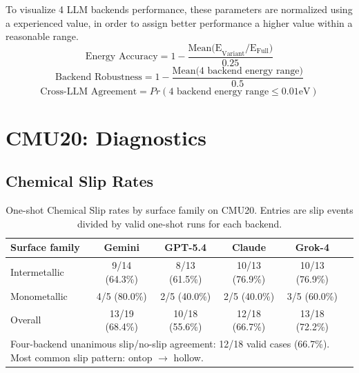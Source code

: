 \documentclass[%
 preprint,
 superscriptaddress,
 amsmath,amssymb,
 aps,
 prb,
 floatfix,
]{revtex4-2}
\begin{document}
To visualize 4 LLM backends performance, these parameters are normalized using a experienced value, in order to assign better performance a higher value within a reasonable range.
\begin{equation}
    \text{Energy Accuracy} = 1 - \frac{\text{Mean(E}_{\text{Variant}}/\text{E}_{\text{Full}})}{0.25} 
\end{equation}
\begin{equation}
    \text{Backend Robustness} = 1 - \frac{\text{Mean(4 backend energy range)}}{0.5} 
\end{equation}
\begin{equation}
\text{Cross-LLM Agreement} = Pr(\text{4 backend energy range} \leq 0.01 \text{eV}) 
\end{equation}




\section{CMU20: Diagnostics}

\subsection{Chemical Slip Rates}

\begin{table}[ht]
\centering
\caption{One-shot Chemical Slip rates by surface family on CMU20. Entries are slip events divided by valid one-shot runs for each backend.}
\label{tab:si-slip}
\begin{tabular}{lccccc}
\toprule
Surface family & Gemini & GPT-5.4 & Claude & Grok-4 \\
\midrule
Intermetallic & 9/14 (64.3\%) & 8/13 (61.5\%) & 10/13 (76.9\%) & 10/13 (76.9\%) \\
Monometallic & 4/5 (80.0\%) & 2/5 (40.0\%) & 2/5 (40.0\%) & 3/5 (60.0\%) \\
Overall & 13/19 (68.4\%) & 10/18 (55.6\%) & 12/18 (66.7\%) & 13/18 (72.2\%) \\
\midrule
\multicolumn{5}{l}{Four-backend unanimous slip/no-slip agreement: 12/18 valid cases (66.7\%). Most common slip pattern: ontop $\rightarrow$ hollow.} \\
\bottomrule
\end{tabular}%
\end{table}
\end{document}
